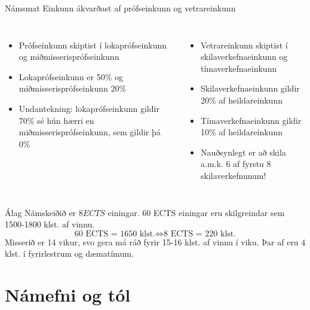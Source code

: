 \documentclass[handout]{beamer}
\begin{document}
\begin{frame}{Námsmat}
Einkunn ákvarðast af prófseinkunn og vetrareinkunn
\begin{columns}
\begin{itemize}
 \item Prófseinkunn skiptist í lokaprófseinkunn og miðmisserisprófseinkunn
 \item Lokaprófseinkunn er 50\% og miðmisserisprófseinkunn 20\%
 \item Undantekning: lokaprófseinkunn gildir 70\% sé hún hærri en miðmisserisprófseinkunn, sem gildir þá 0\%
\end{itemize}
\begin{itemize}
 \item Vetrareinkunn skiptist í skilaverkefnaeinkunn og tímaverkefnaeinkunn
 \item Skilaverkefnaeinkunn gildir 20\% af heildareinkunn
 \item Tímaverkefnaeinkunn gildir 10\% af heildareinkunn
 \item Nauðsynlegt er að skila a.m.k. 6 af fyrstu 8 skilaverkefnunum!
\end{itemize}
\end{columns}
\end{frame}

\begin{frame}{Álag}
Námskeiðið er $8 ECTS$ einingar. 60 ECTS einingar eru skilgreindar sem 1500-1800 klst. af vinnu.
\[
\text{60 ECTS = 1650 klst.} \Longleftrightarrow \text{8 ECTS = 220 klst.}
\]
Misserið er 14 vikur, svo gera má ráð fyrir 15-16 klst. af vinnu í viku. Þar af eru 4 klst. í fyrirlestrum og dæmatímum.
\end{frame}

\section{Námefni og tól}
\end{document}
